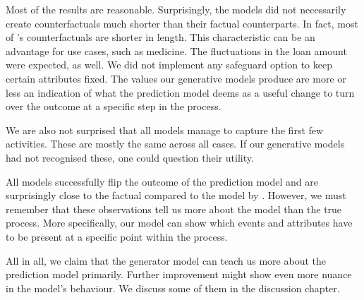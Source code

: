 \documentclass[./../../paper.tex]{subfiles}
\begin{document}
Most of the results are reasonable. Surprisingly, the models did not necessarily create counterfactuals much shorter than their factual counterparts. In fact, most of \citeauthor{hsieh_DiCE4ELInterpretingProcess_2021}'s counterfactuals are shorter in length.  This characteristic can be an advantage for use cases, such as medicine. The fluctuations in the loan amount were expected, as well. We did not implement any safeguard option to keep certain attributes fixed. The values our generative models produce are more or less an indication of what the prediction model deems as a useful change to turn over the outcome at a specific step in the process. 

We are also not surprised that all models manage to capture the first few activities. These are mostly the same across all cases. If our generative models had not recognised these, one could question their utility. 

All models successfully flip the outcome of the prediction model and are surprisingly close to the factual compared to the model by \citeauthor{hsieh_DiCE4ELInterpretingProcess_2021}. However, we must remember that these observations tell us more about the model than the true process. More specifically, our model can show which events and attributes have to be present at a specific point within the process. 
   

All in all, we claim that the generator model can teach us more about the prediction model primarily. Further improvement might show even more nuance in the model's behaviour. We discuss some of them in the discussion chapter.
\end{document}

